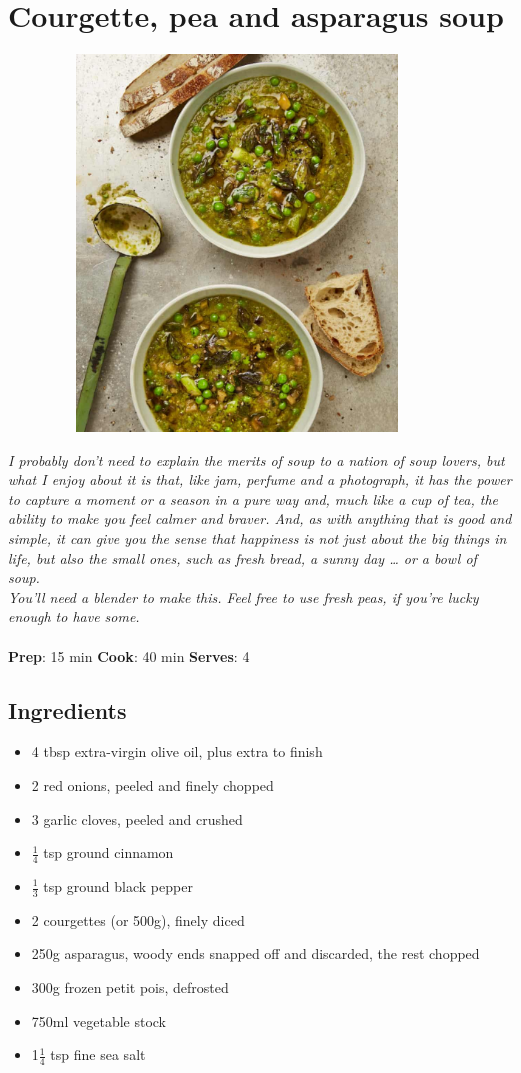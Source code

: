 \documentclass{book}
\begin{document}
\section{Courgette, pea and asparagus soup}
\begin{figure}
\centering\includegraphics[width=10cm,height=10cm,keepaspectratio]{Recipe_Pictures/Courgette,_pea_and_asparagus_soup.png}
\end{figure}
\emph{I probably don’t need to explain the merits of soup to a nation of soup lovers, but what I enjoy about it is that, like jam, perfume and a photograph, it has the power to capture a moment or a season in a pure way and, much like a cup of tea, the ability to make you feel calmer and braver. And, as with anything that is good and simple, it can give you the sense that happiness is not just about the big things in life, but also the small ones, such as fresh bread, a sunny day … or a bowl of soup.\\ 
You’ll need a blender to make this. Feel free to use fresh peas, if you’re lucky enough to have some.}\\\\ 
\textbf{Prep}: 15 min
\textbf{Cook}: 40 min
\textbf{Serves}: 4
\subsection*{Ingredients}
\begin{itemize}
\item 4 tbsp extra-virgin olive oil, plus extra to finish
\item 2 red onions, peeled and finely chopped
\item 3 garlic cloves, peeled and crushed
\item $\frac{1}{4}$ tsp ground cinnamon
\item $\frac{1}{3}$ tsp ground black pepper
\item 2 courgettes (or 500g), finely diced
\item 250g asparagus, woody ends snapped off and discarded, the rest chopped
\item 300g frozen petit pois, defrosted
\item 750ml vegetable stock
\item 1$\frac{1}{4}$ tsp fine sea salt
\end{itemize}
\end{document}
